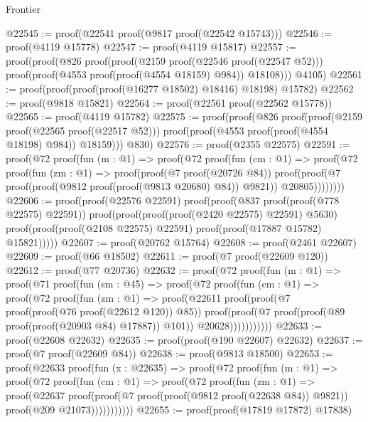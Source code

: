 \begin{lexlean}{Frontier}
\begin{coremodule}
@22545 := proof(@22541 proof(@9817 proof(@22542 @15743)))
@22546 := proof(@4119 @15778)
@22547 := proof(@4119 @15817)
@22557 := proof(proof(@826
        proof(proof(@2159 proof(@22546 proof(@22547 @52)))
            proof(proof(@4553 proof(proof(@4554 @18159) @984)) @18108)))
      @4105)
@22561 := proof(proof(proof(proof(@16277 @18502) @18416) @18198) @15782)
@22562 := proof(@9818 @15821)
@22564 := proof(@22561 proof(@22562 @15778))
@22565 := proof(@4119 @15782)
@22575 := proof(proof(@826
        proof(proof(@2159 proof(@22565 proof(@22517 @52)))
            proof(proof(@4553 proof(proof(@4554 @18198) @984)) @18159)))
      @830)
@22576 := proof(@2355 @22575)
@22591 := proof(@72
      proof(fun (m : @1) =>
        proof(@72
            proof(fun (cm : @1) =>
              proof(@72
                  proof(fun (zm : @1) =>
                    proof(proof(@7 proof(@20726 @84))
                        proof(proof(@7 proof(proof(@9812 proof(proof(@9813 @20680) @84)) @9821))
                            @20805))))))))
@22606 := proof(proof(@22576 @22591)
      proof(proof(@837 proof(proof(@778 @22575) @22591))
          proof(proof(proof(proof(@2420 @22575) @22591) @5630)
              proof(proof(proof(@2108 @22575) @22591) proof(proof(@17887 @15782) @15821)))))
@22607 := proof(@20762 @15764)
@22608 := proof(@2461 @22607)
@22609 := proof(@66 @18502)
@22611 := proof(@7 proof(@22609 @120))
@22612 := proof(@77 @20736)
@22632 := proof(@72
      proof(fun (m : @1) =>
        proof(@71
            proof(fun (sm : @45) =>
              proof(@72
                  proof(fun (cm : @1) =>
                    proof(@72
                        proof(fun (zm : @1) =>
                          proof(@22611
                              proof(proof(@7 proof(proof(@76 proof(@22612 @120)) @85))
                                  proof(proof(@7
                                        proof(proof(@89 proof(proof(@20903 @84) @17887)) @101))
                                      @20628)))))))))))
@22633 := proof(@22608 @22632)
@22635 := proof(proof(@190 @22607) @22632)
@22637 := proof(@7 proof(@22609 @84))
@22638 := proof(@9813 @18500)
@22653 := proof(@22633
      proof(fun (x : @22635) =>
        proof(@72
            proof(fun (m : @1) =>
              proof(@72
                  proof(fun (cm : @1) =>
                    proof(@72
                        proof(fun (zm : @1) =>
                          proof(@22637
                              proof(proof(@7 proof(proof(@9812 proof(@22638 @84)) @9821))
                                  proof(@209 @21073)))))))))))
@22655 := proof(proof(@17819 @17872) @17838)

\end{coremodule}
\end{lexlean}
